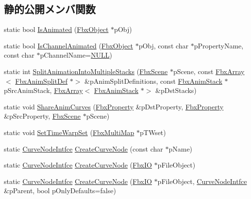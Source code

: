 \subsection*{静的公開メンバ関数}
\begin{DoxyCompactItemize}
\item 
static bool \hyperlink{class_fbx_anim_utilities_aded021028322b991d38cb1683455a1c2}{Is\+Animated} (\hyperlink{class_fbx_object}{Fbx\+Object} $\ast$p\+Obj)
\item 
static bool \hyperlink{class_fbx_anim_utilities_a9748f17b14f4ad8cc0480d36bcaaed37}{Is\+Channel\+Animated} (\hyperlink{class_fbx_object}{Fbx\+Object} $\ast$p\+Obj, const char $\ast$p\+Property\+Name, const char $\ast$p\+Channel\+Name=\hyperlink{fbxarch_8h_a070d2ce7b6bb7e5c05602aa8c308d0c4}{N\+U\+LL})
\item 
static int \hyperlink{class_fbx_anim_utilities_a74a095d049f34889da64d01f58863b66}{Split\+Animation\+Into\+Multiple\+Stacks} (\hyperlink{class_fbx_scene}{Fbx\+Scene} $\ast$p\+Scene, const \hyperlink{class_fbx_array}{Fbx\+Array}$<$ \hyperlink{class_fbx_anim_utilities_1_1_fbx_anim_split_def}{Fbx\+Anim\+Split\+Def} $\ast$$>$ \&p\+Anim\+Split\+Definitions, const \hyperlink{class_fbx_anim_stack}{Fbx\+Anim\+Stack} $\ast$p\+Src\+Anim\+Stack, \hyperlink{class_fbx_array}{Fbx\+Array}$<$ \hyperlink{class_fbx_anim_stack}{Fbx\+Anim\+Stack} $\ast$$>$ \&p\+Dst\+Stacks)
\item 
static void \hyperlink{class_fbx_anim_utilities_a14e8cc17ad5b9a68f508e8f82b224b0f}{Share\+Anim\+Curves} (\hyperlink{class_fbx_property}{Fbx\+Property} \&p\+Dst\+Property, \hyperlink{class_fbx_property}{Fbx\+Property} \&p\+Src\+Property, \hyperlink{class_fbx_scene}{Fbx\+Scene} $\ast$p\+Scene)
\item 
static void \hyperlink{class_fbx_anim_utilities_a13e6dd0dc804b568287852200200dc5d}{Set\+Time\+Warp\+Set} (\hyperlink{class_fbx_multi_map}{Fbx\+Multi\+Map} $\ast$p\+T\+Wset)
\item 
static \hyperlink{class_fbx_anim_utilities_1_1_curve_node_intfce}{Curve\+Node\+Intfce} \hyperlink{class_fbx_anim_utilities_a989f371a71e08e7bdd2d0ac7f3a9bc76}{Create\+Curve\+Node} (const char $\ast$p\+Name)
\item 
static \hyperlink{class_fbx_anim_utilities_1_1_curve_node_intfce}{Curve\+Node\+Intfce} \hyperlink{class_fbx_anim_utilities_aceaa489cb52448cb054998332e7cf1eb}{Create\+Curve\+Node} (\hyperlink{class_fbx_i_o}{Fbx\+IO} $\ast$p\+File\+Object)
\item 
static \hyperlink{class_fbx_anim_utilities_1_1_curve_node_intfce}{Curve\+Node\+Intfce} \hyperlink{class_fbx_anim_utilities_a321e3ca8208ab899a5bb93ee2ae37a35}{Create\+Curve\+Node} (\hyperlink{class_fbx_i_o}{Fbx\+IO} $\ast$p\+File\+Object, \hyperlink{class_fbx_anim_utilities_1_1_curve_node_intfce}{Curve\+Node\+Intfce} \&p\+Parent, bool p\+Only\+Defaults=false)

\end{DoxyCompactItemize}
